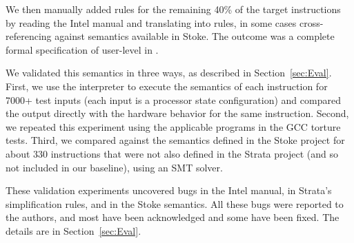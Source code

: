 
We then manually added \K rules for the remaining 40\% of the target instructions by reading the Intel manual and translating into \K rules, in some cases cross-referencing against semantics available in Stoke.
%
The outcome was a complete formal specification of user-level \ISA in \K.

We validated this semantics in three ways, as described in Section~\ref{sec:Eval}.
%
First, we use the \K interpreter to execute the semantics of each instruction for 7000+ test inputs (each input is a processor state configuration) and compared the output directly with the hardware behavior for the same instruction.
%
Second, we repeated this experiment using the applicable programs in the GCC torture tests.  %
%
Third, we compared against the semantics defined in the Stoke project for about 330 instructions that were not also defined in the Strata project (and so not included in our baseline), using an SMT solver.

These validation experiments uncovered bugs in the Intel manual, in Strata's simplification rules, and in the Stoke semantics.  All these bugs were reported to the authors, and most have been acknowledged and some have been fixed.  The details are in Section~\ref{sec:Eval}.


